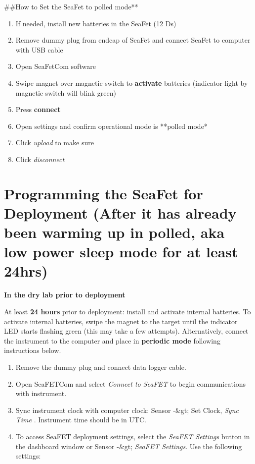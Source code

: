 \documentclass[]{book}
\providecommand{\tightlist}{%
  \setlength{\itemsep}{0pt}\setlength{\parskip}{0pt}}
\begin{document}
\#\#How to Set the SeaFet to polled mode**

\begin{enumerate}
\def\labelenumi{\arabic{enumi}.}
\tightlist
\item
  If needed, install new batteries in the SeaFet (12 Ds)
\item
  Remove dummy plug from endcap of SeaFet and connect SeaFet to computer with USB cable
\item
  Open SeaFetCom software
\item
  Swipe magnet over magnetic switch to \textbf{activate} batteries (indicator light by magnetic switch will blink green)
\item
  Press \textbf{connect}
\item
  Open settings and confirm operational mode is **polled mode*
\item
  Click \emph{upload} to make sure
\item
  Click \emph{disconnect}
\end{enumerate}

\hypertarget{programming-the-seafet-for-deployment-after-it-has-already-been-warming-up-in-polled-aka-low-power-sleep-mode-for-at-least-24hrs}{%
\section{Programming the SeaFet for Deployment (After it has already been warming up in polled, aka low power sleep mode for at least 24hrs)}\label{programming-the-seafet-for-deployment-after-it-has-already-been-warming-up-in-polled-aka-low-power-sleep-mode-for-at-least-24hrs}}

\textbf{In the dry lab prior to deployment}

At least \textbf{24 hours} prior to deployment: install and activate internal batteries. To activate internal batteries, swipe the magnet to the target until the indicator LED starts flashing green (this may take a few attempts). Alternatively, connect the instrument to the computer and place in \textbf{periodic mode} following instructions below.

\begin{enumerate}
\def\labelenumi{\arabic{enumi}.}
\item
  Remove the dummy plug and connect data logger cable.
\item
  Open SeaFETCom and select \emph{Connect to SeaFET} to begin communications with instrument.
\item
  Sync instrument clock with computer clock: Sensor -\&gt; Set Clock, \emph{Sync Time} . Instrument time should be in UTC.
\item
  To access SeaFET deployment settings, select the \emph{SeaFET Settings} button in the dashboard window or Sensor -\&gt; \emph{SeaFET Settings}. Use the following settings:
\end{enumerate}
\end{document}
